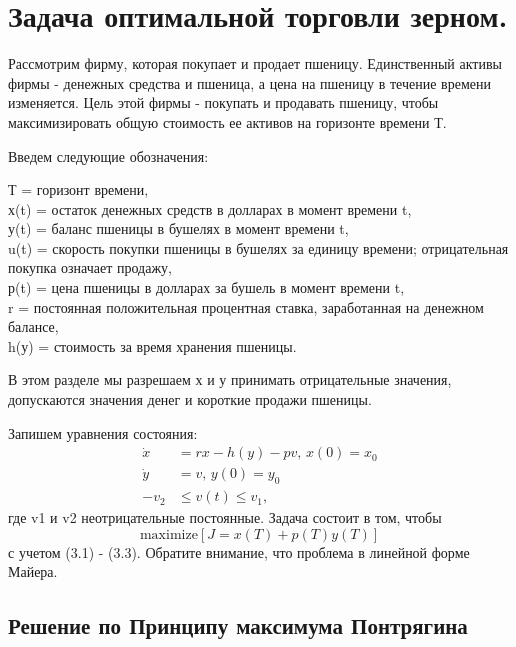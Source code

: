 \section{Задача оптимальной торговли зерном.}

Рассмотрим фирму, которая покупает и продает пшеницу. Единственный активы фирмы - денежных средства и пшеница, а цена на пшеницу в течение времени изменяется. Цель этой фирмы - покупать и продавать пшеницу, чтобы максимизировать общую стоимость ее активов на горизонте времени Т.  

Введем следующие обозначения:
 
{Т} = горизонт времени,\\
{х(t)} = остаток денежных средств в долларах в момент времени t,\\
{у(t)} = баланс пшеницы в бушелях в момент времени t,\\ 
{u(t)} = скорость покупки пшеницы в бушелях за единицу времени; отрицательная покупка означает продажу,\\
{р(t)} = цена пшеницы в долларах за бушель в момент времени t,\\
{r} = постоянная положительная процентная ставка, заработанная на денежном балансе,\\
{h(у)} = стоимость за время хранения пшеницы.
 
В этом разделе мы разрешаем {х} и {у} принимать отрицательные значения, допускаются значения денег и короткие продажи пшеницы.


Запишем уравнения состояния:
\begin{align}
    \Dot{x} & = r x - h(y) - p v,\, x(0) = x_{0} \\
    \Dot{y} & = v, \, y(0) = y_{0} \label{e:one_more} \\
    - v_2 & \le v(t) \le v_1,
\end{align}    
где {v1} и {v2} неотрицательные постоянные. Задача состоит в том, чтобы
\[
  \mathrm{maximize} [J = x(T) + p(T) y(T)]
\]
с учетом (3.1) - (3.3). Обратите внимание, что проблема в линейной форме Майера.

\subsection{Решение по Принципу максимума Понтрягина}

